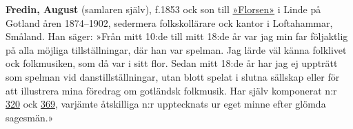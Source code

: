 \textbf{Fredin, August} (samlaren själv), f.\@ 1853 ock son till \href{Florsen}{»Florsen»} i Linde på Gotland åren 1874--1902, sedermera folkskollärare ock kantor i Loftahammar, Småland. Han säger:
»Från mitt 10:de till mitt 18:de år var jag min far följaktlig på alla möjliga tillställningar, där han var spelman. Jag lärde väl känna folklivet ock folkmusiken, som då var i sitt flor. Sedan mitt 18:de år har jag ej uppträtt som spelman vid danstillställningar, utan blott spelat i slutna sällskap eller för att illustrera mina föredrag om gotländsk folkmusik. Har själv komponerat n:r \href{320}{320} ock \href{369}{369}, varjämte åtskilliga n:r upptecknats ur eget minne efter glömda sagesmän.» 
